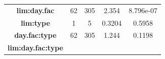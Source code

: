 \documentclass[]{article}
\begin{document}
\begin{longtable}[]{@{}ccccc@{}}
\begin{minipage}[t]{0.27\columnwidth}
\textbf{lim:day.fac}\strut
\end{minipage} & \begin{minipage}[t]{0.10\columnwidth}\centering\strut
62\strut
\end{minipage} & \begin{minipage}[t]{0.10\columnwidth}\centering\strut
305\strut
\end{minipage} & \begin{minipage}[t]{0.12\columnwidth}\centering\strut
2.354\strut
\end{minipage} & \begin{minipage}[t]{0.12\columnwidth}\centering\strut
8.796e-07\strut
\end{minipage}\tabularnewline
\begin{minipage}[t]{0.27\columnwidth}\centering\strut
\textbf{lim:type}\strut
\end{minipage} & \begin{minipage}[t]{0.10\columnwidth}\centering\strut
1\strut
\end{minipage} & \begin{minipage}[t]{0.10\columnwidth}\centering\strut
5\strut
\end{minipage} & \begin{minipage}[t]{0.12\columnwidth}\centering\strut
0.3204\strut
\end{minipage} & \begin{minipage}[t]{0.12\columnwidth}\centering\strut
0.5958\strut
\end{minipage}\tabularnewline
\begin{minipage}[t]{0.27\columnwidth}\centering\strut
\textbf{day.fac:type}\strut
\end{minipage} & \begin{minipage}[t]{0.10\columnwidth}\centering\strut
62\strut
\end{minipage} & \begin{minipage}[t]{0.10\columnwidth}\centering\strut
305\strut
\end{minipage} & \begin{minipage}[t]{0.12\columnwidth}\centering\strut
1.244\strut
\end{minipage} & \begin{minipage}[t]{0.12\columnwidth}\centering\strut
0.1198\strut
\end{minipage}\tabularnewline
\begin{minipage}[t]{0.27\columnwidth}\centering\strut
\textbf{lim:day.fac:type}\strut
\end{minipage} & \begin{minipage}[t]{0.10\columnwidth}\centering\strut

\end{minipage}
\end{longtable}
\end{document}
